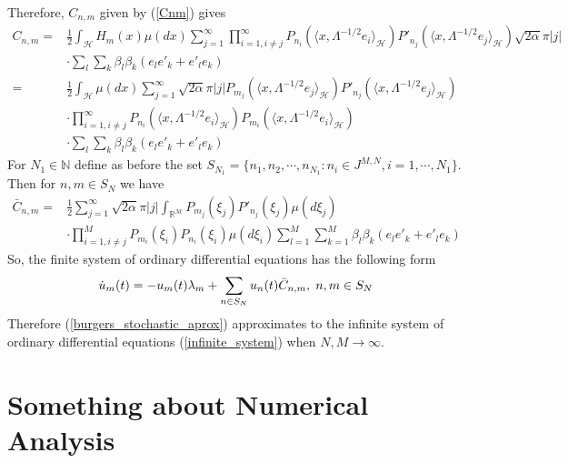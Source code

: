 	\noindent Therefore, $C_{n, m}$ given by (\ref{Cnm}) gives
	\begin{align*}
		C_{n, m} =& \displaystyle \frac{1}{2} \int_{\mathcal{H}} H_m (x) \mu (dx) \sum_{j = 1}^{\infty} \prod_{i = 1, i \neq j}^{\infty} P_{n_i} (\langle x, \Lambda^{-1 / 2} e_i \rangle_{\mathcal{H}}) P'_{n_j} (\langle x, \Lambda^{-1 / 2} e_j \rangle_{\mathcal{H}})  \sqrt{2 \alpha} \pi |j| \\
		&\cdot \sum_l
		\sum_k \beta_l \beta_k (e_l e'_k + e'_l e_k) \\
		=& \displaystyle \frac{1}{2} \int_{\mathcal{H}} \mu (dx) \sum_{j = 1}^{\infty} \sqrt{2 \alpha} \pi |j| P_{m_j} (\langle x, \Lambda^{-1 / 2} e_j \rangle_{\mathcal{H}}) P'_{n_j} (\langle x, \Lambda^{-1 / 2} e_j \rangle_{\mathcal{H}}) \\  &\cdot \prod_{i = 1, i \neq j}^{\infty} P_{n_i} (\langle x, \Lambda^{-1 / 2} e_i \rangle_{\mathcal{H}}) P_{m_i} (\langle x, \Lambda^{-1 / 2} e_i \rangle_{\mathcal{H}}) \\
		&\cdot \sum_l
		\sum_k \beta_l \beta_k (e_l e'_k + e'_l e_k) 
	\end{align*}
	For $N_1 \in \mathbb{N}$ define as before the set $S_{N_1} = \{n_1 , n_2 , \cdots , n_{N_1} : n_i \in J^{M,N} , i = 1, \cdots , N_1 \}$. Then for $n, m \in S_{N}$ we have 
	\begin{align*}
		\bar{C}_{n, m} =& \displaystyle \frac{1}{2} \sum_{j = 1}^{\infty} \sqrt{2 \alpha} \pi |j| \int_{\mathcal{\mathbb{R}^M}} P_{m_j} (\xi_j) P'_{n_j} (\xi_j) \mu (d \xi_j) \\  
		&\cdot \prod_{i = 1, i \neq j}^{M} P_{m_i} (\xi_i) P_{n_i} (\xi_i) \mu (d \xi_i) \sum_{l=1}^{M} \sum_{k=1}^{M} \beta_l \beta_k (e_l e'_k + e'_l e_k)
	\end{align*}
	 So, the finite system of ordinary differential equations has the following form
	\begin{align}
	\label{burgers_stochastic_aprox}
		\dot{u}_{m} (t) = -u_{m} (t) \lambda_{m} + \displaystyle \sum _{n \in S_N} u_{n} (t) \bar{C}_{n, m} , \hspace{0.1cm} n, m \in S_N
	\end{align}
	Therefore (\ref{burgers_stochastic_aprox}) approximates to the infinite system of ordinary differential equations (\ref{infinite_system}) when $N, M \rightarrow \infty$.
	
	\section{Something about Numerical Analysis}
    

